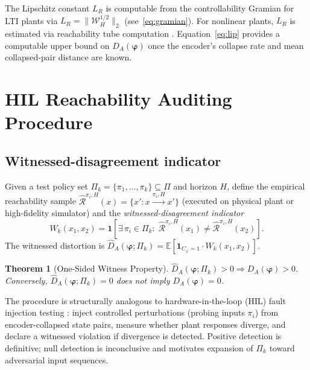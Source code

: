 \documentclass[10pt,twocolumn]{article}
\theoremstyle{plain}
\newtheorem{theorem}{Theorem}
\theoremstyle{definition}
\theoremstyle{remark}
\newcommand{\DA}{D_{A}(\bm{\varphi})}
\newcommand{\bvphi}{\bm{\varphi}}
\newcommand{\E}{\mathbb{E}}
\begin{document}
The Lipschitz constant $L_R$ is computable from the controllability Gramian
for LTI plants via $L_R = \|\mathcal{W}_H^{1/2}\|_2$
(see~\eqref{eq:gramian}). For nonlinear plants, $L_R$ is estimated via
reachability tube computation \citep{tomlin2003computational}.
Equation~\eqref{eq:lip} provides a computable upper bound on $\DA$ once
the encoder's collapse rate and mean collapsed-pair distance are known.

\section{HIL Reachability Auditing Procedure}
\label{sec:hil}

\subsection{Witnessed-disagreement indicator}

Given a test policy set $\Pi_k = \{\pi_1, \ldots, \pi_k\} \subseteq \Pi$
and horizon $H$, define the empirical reachability sample
$\hat{\mathcal{R}}^{\pi_i,H}(x) = \{x' : x \xrightarrow{\pi_i,H} x'\}$
(executed on physical plant or high-fidelity simulator) and the
\emph{witnessed-disagreement indicator}
\begin{equation}
  W_k(x_1,x_2) = \mathbf{1}\!\left[
    \exists\,\pi_i \in \Pi_k :\;
    \hat{\mathcal{R}}^{\pi_i,H}(x_1) \neq \hat{\mathcal{R}}^{\pi_i,H}(x_2)
  \right].
  \label{eq:witness}
\end{equation}
The witnessed distortion is
$\hat{D}_A(\bvphi;\Pi_k) = \E[\mathbf{1}_{C_\varphi=1} \cdot W_k(x_1,x_2)]$.

\begin{theorem}[One-Sided Witness Property]
\label{thm:witness}
$\hat{D}_A(\bvphi;\Pi_k) > 0 \Rightarrow \DA > 0$.
Conversely, $\hat{D}_A(\bvphi;\Pi_k) = 0$ does not imply $\DA = 0$.
\end{theorem}

The procedure is structurally analogous to hardware-in-the-loop (HIL) fault
injection testing \citep{isermann2006fault}: inject controlled perturbations
(probing inputs $\pi_i$) from encoder-collapsed state pairs, measure whether
plant responses diverge, and declare a witnessed violation if divergence is
detected. Positive detection is definitive; null detection is inconclusive
and motivates expansion of $\Pi_k$ toward adversarial input sequences.
\end{document}
